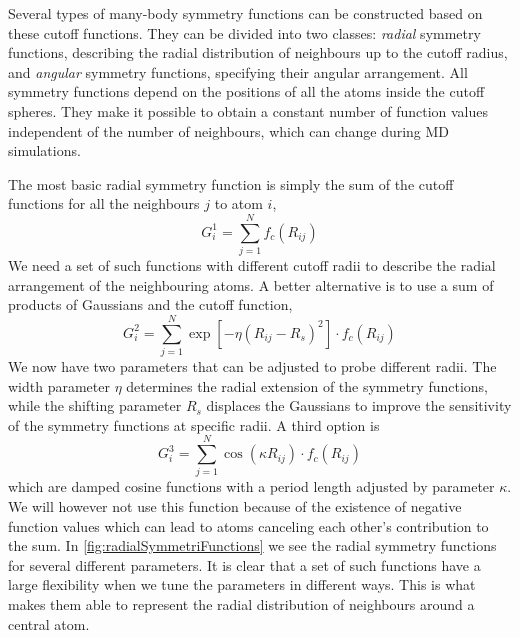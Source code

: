 \documentclass[twoside,english]{uiofysmaster}
\begin{document}
Several types of many-body symmetry functions can be
constructed based on these cutoff functions. They can be divided into two classes: \textit{radial} symmetry functions, describing 
the radial distribution of neighbours up to the cutoff radius, and \textit{angular} symmetry functions, specifying their
angular arrangement. All symmetry functions depend on the positions of all the atoms inside the cutoff spheres. They make
it possible to obtain a constant number of function values independent of the number of neighbours, which can change
during MD simulations. 

The most basic radial symmetry function is simply the sum of the cutoff functions for all the neighbours $j$ to 
atom $i$,
\begin{equation}
 G_i^1 = \sum_{j=1}^N f_c(R_{ij})
 \label{G1}
\end{equation}
We need a set of such functions with different cutoff radii to describe the radial arrangement of the neighbouring atoms. 
A better alternative is to use a sum of products of Gaussians and the cutoff function,
\begin{equation}
 G_i^2 = \sum_{j=1}^N \exp[-\eta(R_{ij}-R_s)^2] \cdot f_c(R_{ij})
 \label{G2}
\end{equation}
We now have two parameters that can be adjusted to probe different radii. The width parameter $\eta$ determines the 
radial extension of the symmetry functions, while the shifting parameter $R_s$ displaces the Gaussians to improve
the sensitivity of the symmetry functions at specific radii. A third option is 
\begin{equation}
 G_i^3 = \sum_{j=1}^N \cos(\kappa R_{ij}) \cdot f_c(R_{ij})
 \label{G3}
\end{equation}
which are damped cosine functions with a period length adjusted by parameter $\kappa$. We will however not use 
this function because of the existence of negative function values which can lead to atoms canceling each other's
contribution to the sum. In \autoref{fig:radialSymmetriFunctions} we see the radial symmetry functions for several
different parameters. It is clear that a set of such functions have a large flexibility when we tune the parameters
in different ways. This is what makes them able to represent the radial distribution of neighbours around a central atom. 
\end{document}
